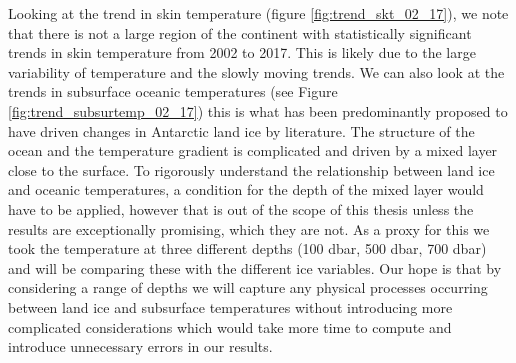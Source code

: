 \documentclass[../main.tex]{subfiles}
\begin{document}
Looking at the trend in skin temperature (figure \ref{fig:trend_skt_02_17}), we note that there is not a large region of the continent with statistically significant trends in skin temperature from 2002 to 2017. This is likely due to the large variability of temperature and the slowly moving trends. We can also look at the trends in subsurface oceanic temperatures (see Figure \ref{fig:trend_subsurtemp_02_17}) this is what has been predominantly proposed to have driven changes in Antarctic land ice by literature. The structure of the ocean and the temperature gradient is complicated and driven by a mixed layer close to the surface. To rigorously understand the relationship between land ice and oceanic temperatures, a condition for the depth of the mixed layer would have to be applied,  however that is out of the scope of this thesis unless the results are exceptionally promising, which they are not. As a proxy for this we took the temperature at three different depths (100 dbar, 500 dbar, 700 dbar) and will be comparing these with the different ice variables. Our hope is that by considering a range of depths we will capture any physical processes occurring between land ice and subsurface temperatures without introducing more complicated considerations which would take more time to compute and introduce unnecessary errors in our results.
\end{document}
